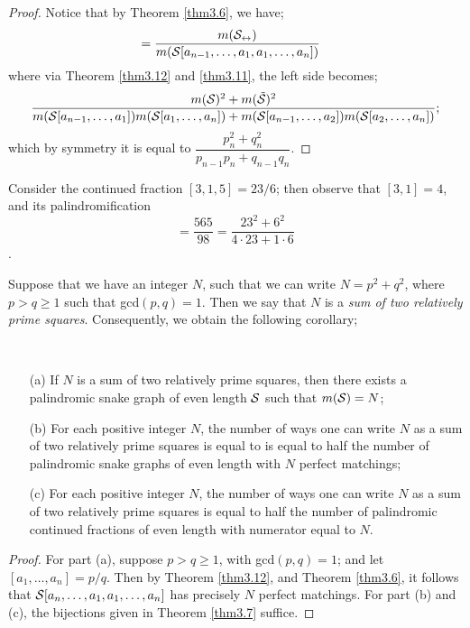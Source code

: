 \begin{proof}
    Notice that by Theorem \ref{thm3.6}, we have;
    \begin{align}
        [a_n,\dots,a_1,a_1,\dots,a_n] &= \dfrac{m(\pal{\s})}{m(\s[a_{n-1},\dots,a_1,a_1,\dots,a_n])}
    \end{align}
    where via Theorem \ref{thm3.12} and \ref{thm3.11}, the left side becomes;
    \begin{equation*}
        \dfrac{m(\mathcal{S})^2 + m(\Tilde{\mathcal{S}})^2}{m(\mathcal{S}[a_{n-1},\dots,a_1])m(\mathcal{S}[a_1,\dots,a_n])+ m(\mathcal{S}[a_{n-1},\dots,a_2])m(\mathcal{S}[a_2,\dots,a_n])};
    \end{equation*}
    which by symmetry it is equal to $ \dfrac{p_n^2 + q_n^2}{p_{n-1}p_n + q_{n-1}q_n}$.
\end{proof}
\begin{example}
    Consider the continued fraction $[3,1,5] = 23/6$; then observe that $[3,1] = 4$, and its palindromification
    \begin{equation*}
        [5,1,3,3,1,5] = \dfrac{565}{98}= \dfrac{23^2 + 6^2}{4 \cdot 23 + 1 \cdot 6}
    \end{equation*}.
\end{example}
Suppose that we have an integer $N$, such that we can write $N = p^2 + q^2$, where $p > q \geq 1$ such that gcd$(p,q) = 1$. Then we say that $N$ is a \emph{sum of two relatively prime squares}. Consequently, we obtain the following corollary;
\begin{corollary}~ 
    \begin{itemize}
        \item[(a)] If $N$ is a sum of two relatively prime squares, then there exists a palindromic snake graph of even length $\mathcal{S}$ such that $m(\mathcal{S}) = N$;
        \item[(b)] For each positive integer $N$, the number of ways one can write $N$ as a sum of two relatively prime squares is equal to is equal to half the number of palindromic snake graphs of even length with $N$ perfect matchings;
        \item[(c)] For each positive integer $N$, the number of ways one can write $N$ as a sum of two relatively prime squares is equal to half the number of palindromic continued fractions of even length with numerator equal to $N$. 
    \end{itemize}
\end{corollary}
\begin{proof}
    For part (a), suppose $p > q \geq 1$, with gcd$(p,q) = 1$; and let $[a_1,\dots,a_n] = p/q$. Then by Theorem \ref{thm3.12}, and Theorem \ref{thm3.6}, it follows that $\mathcal{S}[a_n,\dots,a_1,a_1,\dots,a_n]$ has precisely $N$ perfect matchings. For part (b) and (c), the bijections given in Theorem \ref{thm3.7} suffice.
\end{proof}